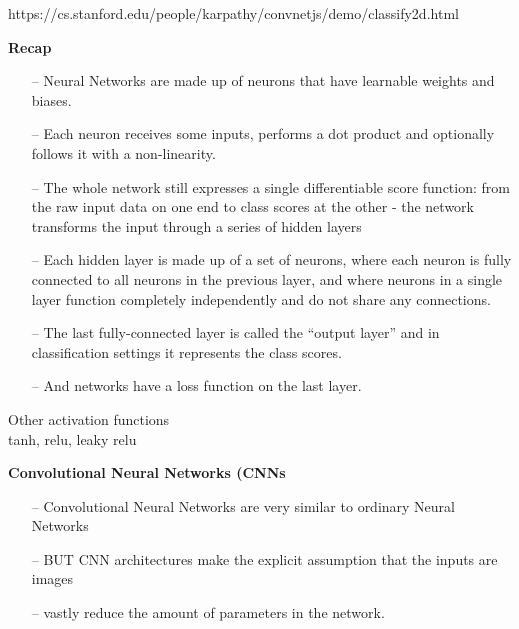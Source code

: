 \documentclass[10pt, compress]{beamer}
\begin{document}
\begin{frame}
  https://cs.stanford.edu/people/karpathy/convnetjs/demo/classify2d.html \\
\end{frame}

\begin{frame}
  \vspace{1cm}
  \textbf{Recap} \\
  \begin{itemize}
    \item[--] Neural Networks are made up of neurons that have learnable weights and biases.
    \item[--] Each neuron receives some inputs, performs a dot product and optionally follows it with a non-linearity.
    \item[--] The whole network still expresses a single differentiable score function: from the raw input data on one end to class scores at the other - the network transforms the input through a series of hidden layers
    \item[--] Each hidden layer is made up of a set of neurons, where each neuron is fully connected to all neurons in the previous layer, and where neurons in a single layer function completely independently and do not share any connections.
    \item[--] The last fully-connected layer is called the “output layer” and in classification settings it represents the class scores.
    \item[--] And networks have a loss function on the last layer.
  \end{itemize}

\end{frame}

\begin{frame}
  Other activation functions \\
  tanh, relu, leaky relu
\end{frame}

\begin{frame}
  \textbf{Convolutional Neural Networks (CNNs} \\ \hfill \break
  \begin{itemize}
    \item[--] Convolutional Neural Networks are very similar to ordinary Neural Networks
    \item[--] BUT CNN architectures make the explicit assumption that the inputs are images
    \item[--] vastly reduce the amount of parameters in the network.
  \end{itemize}
\end{frame}
\end{document}
